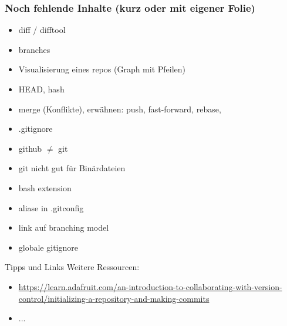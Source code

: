 \documentclass{beamer}
\begin{document}
%
%
%
%
%
%
%
%
%


\begin{frame}[label=gitintro50]
\frametitle{Noch fehlende Inhalte (kurz oder mit eigener Folie)}
\begin{itemize}
\item diff / difftool
\item branches \checkmark
\item Visualisierung eines repos (Graph mit Pfeilen) \checkmark
\item HEAD\checkmark , hash
\item merge (Konflikte),  erwähnen: push, fast-forward, rebase,
\item .gitignore
\item github $\neq$ git
\item git nicht gut für Binärdateien
\item bash extension
\item aliase in .gitconfig
\item link auf branching model
\item globale gitignore

\end{itemize}
\end{frame}


\begin{frame}[label=link10]{Tipps und Links}
Weitere Ressourcen:
\tiny
\begin{itemize}
 \item
\url{https://learn.adafruit.com/an-introduction-to-collaborating-with-version-control/initializing-a-repository-and-making-commits}
\item ...
\end{itemize}


\end{frame}
\end{document}
